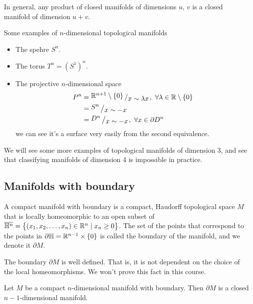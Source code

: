 \documentclass[11pt,a4paper]{article}
\begin{document}
\begin{remark}
    In general, any product of closed manifolds of dimensions
    $u$, $v$ is a closed manifold of dimension $u + v$.
\end{remark}


Some examples of $n$-dimensional topological manifolds
\begin{itemize}
  \item The spehre $S^n$.
  \item The torus $T^n = (S^1)^n$.
  \item The projective $n$-dimensional space
    \begin{align*}
      P^n &= \bigslant{\R^{n+1} \setminus \set{0}}{x \sim \lambda x},\ 
        \forall \lambda \in \R \setminus \set{0} \\
      &= \bigslant{S^n}{x \sim -x} \\
      &= \bigslant{D^n}{x \sim -x},\ \forall x \in \partial D^n
    \end{align*}
  we can see it's a surface very easily from the second equivalence.
\end{itemize}
We will see some more examples of topological manifolds of dimension
$3$, and see that classifying manifolds of dimension $4$ is impossible
in practice.

\subsection{Manifolds with boundary}
\begin{definition}
  A compact manifold with boundary is a compact, Haudorff topological 
  space $M$ that is locally homeomorphic to an open subset of
  $\overline {\mathbb H^n} = \set{(x_1,x_2,\dots,x_n) \in 
  \mathbb{R}^n \mid x_n \geq 0}$.
  The set of the points that correspond to the points in
  $\partial \mathbb H = \mathbb{R}^{n-1} \times \set{0}$ is called the boundary of
  the manifold, and we denote it $\partial M$.
\end{definition}
\begin{remark}
  The boundary $\partial M$ is well defined.
  That is, it is not dependent on the choice of the local homeomorphisms.
  We won't prove this fact in this course.
\end{remark}

\begin{proposition}
  Let $M$ be a compact $n$-dimensional manifold with boundary.
  Then $\partial M$ is a closed $n-1$-dimensional manifold.
\end{proposition}
\end{document}
